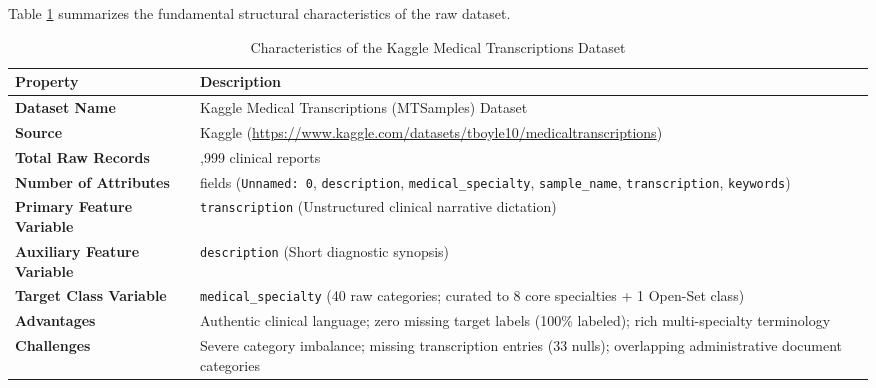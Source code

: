 Table \ref{tab:dataset_summary_card} summarizes the fundamental structural characteristics of the raw dataset.

\begin{table}[H]
\centering
\small
\setlength{\tabcolsep}{5pt}
\begin{tabularx}{\linewidth}{|>{\raggedright\arraybackslash}p{3.8cm}|>{\raggedright\arraybackslash}X|}
\hline
\textbf{Property} & \textbf{Description} \\
\hline
\textbf{Dataset Name} & Kaggle Medical Transcriptions (MTSamples) Dataset \\
\hline
\textbf{Source} & Kaggle (\url{https://www.kaggle.com/datasets/tboyle10/medicaltranscriptions}) \\
\hline
\textbf{Total Raw Records} & 4,999 clinical reports \\
\hline
\textbf{Number of Attributes} & 6 fields (\texttt{Unnamed: 0}, \texttt{description}, \texttt{medical\_specialty}, \texttt{sample\_name}, \texttt{transcription}, \texttt{keywords}) \\
\hline
\textbf{Primary Feature Variable} & \texttt{transcription} (Unstructured clinical narrative dictation) \\
\hline
\textbf{Auxiliary Feature Variable} & \texttt{description} (Short diagnostic synopsis) \\
\hline
\textbf{Target Class Variable} & \texttt{medical\_specialty} (40 raw categories; curated to 8 core specialties + 1 Open-Set class) \\
\hline
\textbf{Advantages} & Authentic clinical language; zero missing target labels (100\% labeled); rich multi-specialty terminology \\
\hline
\textbf{Challenges} & Severe category imbalance; missing transcription entries (33 nulls); overlapping administrative document categories \\
\hline
\end{tabularx}
\caption{Characteristics of the Kaggle Medical Transcriptions Dataset}
\label{tab:dataset_summary_card}
\end{table}

